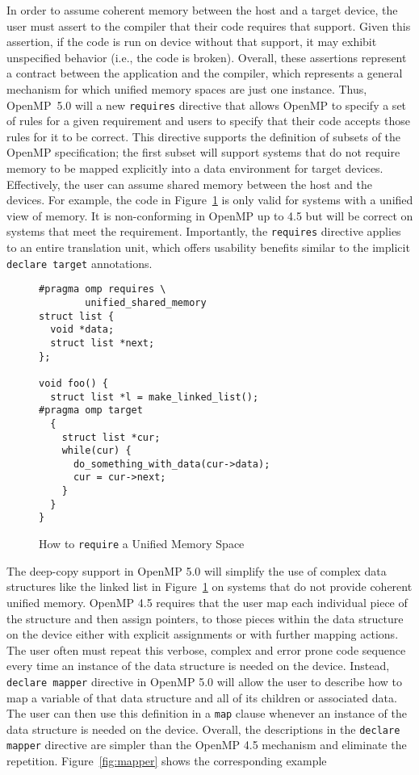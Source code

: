 In order to assume coherent memory between the host and a target device, 
the user must assert to the compiler that their code requires that support.
Given this assertion, if the code is run on device without that support, 
it may exhibit unspecified behavior (i.e., the code is broken). Overall,
these assertions represent a contract between the application and the 
compiler, which represents a general mechanism for which unified memory
spaces are just one instance. Thus, OpenMP~5.0 will a new \texttt{requires} 
directive that allows OpenMP to specify a set of rules for a given 
requirement and users to specify that their code accepts those rules for
it to be correct. This directive supports the definition of subsets of 
the OpenMP specification; the first subset will support systems that do 
not require memory to be mapped explicitly into a data environment for 
target devices. Effectively, the user can assume shared memory between
the host and the devices. For example, the code in Figure~\ref{fig:unified} 
is only valid for systems with a unified view of memory. It is non-conforming 
in OpenMP up to 4.5 but will be correct on systems that meet the requirement.
Importantly, the \texttt{requires} directive applies to an entire translation
unit, which offers usability benefits similar to the implicit 
\texttt{declare target} annotations.

\begin{figure}
\begin{verbatim}
#pragma omp requires \
        unified_shared_memory
struct list {
  void *data;
  struct list *next;
};

void foo() {
  struct list *l = make_linked_list();
#pragma omp target
  {
    struct list *cur;
    while(cur) {
      do_something_with_data(cur->data);
      cur = cur->next;
    }
  }
}
\end{verbatim}
\caption{How to \texttt{require} a Unified Memory Space}
\label{fig:unified}
\end{figure}

The deep-copy support in OpenMP 5.0 will simplify the use of complex data
structures like the linked list in Figure~\ref{fig:unified} on systems that 
do not provide coherent unified memory. OpenMP 4.5 requires that the user map 
each individual piece of the structure and then assign pointers, to those 
pieces within the data structure on the device either with explicit 
assignments or with further mapping actions. The user often must repeat this 
verbose, complex and error prone code sequence every time an instance of the 
data structure is needed on the device. Instead, \texttt{declare mapper}
directive in OpenMP 5.0 will allow the user to describe how to map a variable 
of that data structure and all of its children or associated data. The user
can then use this definition in a \texttt{map} clause whenever an instance 
of the data structure is needed on the device. Overall, the descriptions in
the \texttt{declare mapper} directive are simpler than the OpenMP 4.5
mechanism and eliminate the repetition. Figure~\ref{fig:mapper} shows the
corresponding example

